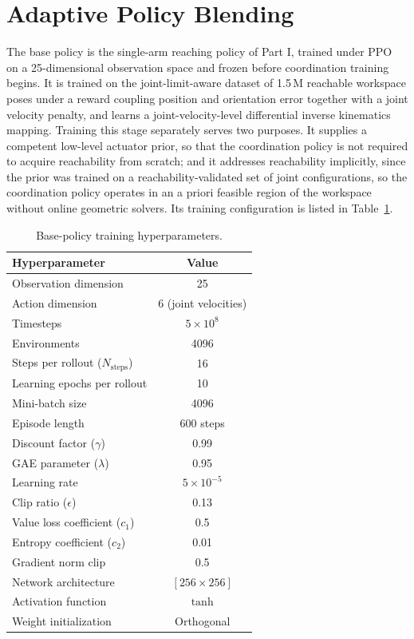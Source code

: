 \section{Adaptive Policy Blending}\label{sec:alpha_blending}

The base policy is the single-arm reaching policy of Part I, trained under PPO~\citep{schulman2017proximal}
on a 25-dimensional observation space and frozen before coordination training begins. It is trained on
the joint-limit-aware dataset of 1.5\,M reachable workspace poses under a reward coupling position and
orientation error together with a joint velocity penalty, and learns a joint-velocity-level
differential inverse kinematics mapping. Training this stage separately serves two purposes. It
supplies a competent low-level actuator prior, so that the coordination policy is not required to
acquire reachability from scratch; and it addresses reachability implicitly, since the prior was
trained on a reachability-validated set of joint configurations, so the coordination policy operates
in an a priori feasible region of the workspace without online geometric solvers. Its training
configuration is listed in Table~\ref{tab:alpha_basehyper}.

\begin{table}[htbp]
\centering
\caption{Base-policy training hyperparameters.}
\label{tab:alpha_basehyper}
\begin{tabular}{lc}
\toprule
\textbf{Hyperparameter} & \textbf{Value} \\
\midrule
Observation dimension       & 25 \\
Action dimension            & 6 (joint velocities) \\
Timesteps                   & $5 \times 10^{8}$ \\
Environments                & 4096 \\
Steps per rollout ($N_{\text{steps}}$) & 16 \\
Learning epochs per rollout & 10 \\
Mini-batch size             & 4096 \\
Episode length              & 600 steps \\
Discount factor ($\gamma$)  & 0.99 \\
GAE parameter ($\lambda$)   & 0.95 \\
Learning rate               & $5 \times 10^{-5}$ \\
Clip ratio ($\epsilon$)     & 0.13 \\
Value loss coefficient ($c_1$) & 0.5 \\
Entropy coefficient ($c_2$) & 0.01 \\
Gradient norm clip          & 0.5 \\
Network architecture        & $[256 \times 256]$ \\
Activation function         & $\tanh$ \\
Weight initialization       & Orthogonal \\
\bottomrule
\end{tabular}
\end{table}

